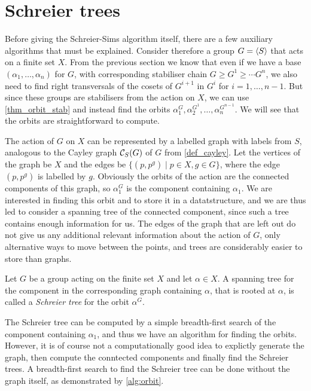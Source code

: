 \section{Schreier trees}
Before giving the Schreier-Sims algorithm itself, there are a few
auxiliary algorithms that must be explained. Consider therefore a
group $G = \left\langle S \right\rangle$ that acts on a finite set $X$. From the previous
section we know that even if we have a base $(\alpha_1, \dotsc,
\alpha_n)$ for $G$, with corresponding stabiliser chain $G \geq G^1
\geq \dotsb G^n$, we also need to find right transversals of the cosets of
$G^{i + 1}$ in $G^i$ for $i = 1, \dotsc, n - 1$. But since these groups
are stabilisers from the action on $X$, we can use
\ref{thm_orbit_stab} and instead find the orbits $\alpha_1^G,
\alpha_2^{G^1}, \dotsc, \alpha_n^{G^{n - 1}}$. We will see that the orbits are straightforward to compute.

The action of $G$ on $X$ can be represented by a labelled graph with
labels from $S$, analogous to the Cayley graph $\mathcal{C}_S(G)$ of $G$ from
\ref{def_cayley}. Let the vertices of the graph be $X$ and the edges
be $\{(p, p^g) \mid p \in X, g \in G\}$, where the edge $(p, p^g)$ is
labelled by $g$. Obviously the orbits of the action are the connected
components of this graph, so $\alpha_1^G$ is the component containing
$\alpha_1$. We are interested in finding this orbit and to store it in
a datatstructure, and we are thus led to consider a spanning tree of
the connected component, since such a tree contains enough information
for us. The edges of the graph that are left out do not give us any
additional relevant information about the action of $G$, only
alternative ways to move between the points, and trees are
considerably easier to store than graphs.

\begin{deff} \label{def_bsgs}
  Let $G$ be a group acting on the finite set $X$ and let $\alpha \in
  X$. A spanning tree for the component in the corresponding graph
  containing $\alpha$, that is rooted at $\alpha$, is called a
  \emph{Schreier tree} for the orbit $\alpha^G$.
\end{deff}

The Schreier tree can be computed by a simple breadth-first search of
the component containing $\alpha_1$, and thus we have an algorithm for
finding the orbits. However, it is of course not a computationally
good idea to explictly generate the graph, then compute the conntected
components and finally find the Schreier trees. A breadth-first search
to find the Schreier tree can be done without the graph itself, as
demonstrated by \ref{alg:orbit}.

